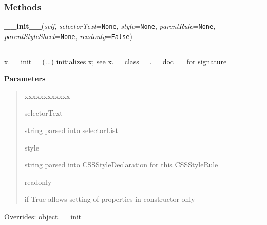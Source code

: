
  \subsubsection{Methods}

    \vspace{0.5ex}

\hspace{.8\funcindent}\begin{boxedminipage}{\funcwidth}

    \raggedright \textbf{\_\_init\_\_}(\textit{self}, \textit{selectorText}={\tt None}, \textit{style}={\tt None}, \textit{parentRule}={\tt None}, \textit{parentStyleSheet}={\tt None}, \textit{readonly}={\tt False})

    \vspace{-1.5ex}

    \rule{\textwidth}{0.5\fboxrule}
\setlength{\parskip}{2ex}
    x.\_\_init\_\_(...) initializes x; see x.\_\_class\_\_.\_\_doc\_\_ for 
    signature

\setlength{\parskip}{1ex}
      \textbf{Parameters}
      \vspace{-1ex}

      \begin{quote}
        \begin{Ventry}{xxxxxxxxxxxx}

          \item[selectorText]


string parsed into selectorList
          \item[style]


string parsed into CSSStyleDeclaration for this CSSStyleRule
          \item[readonly]


if True allows setting of properties in constructor only
        \end{Ventry}

      \end{quote}

      Overrides: object.\_\_init\_\_

    \end{boxedminipage}

    \vspace{0.5ex}

